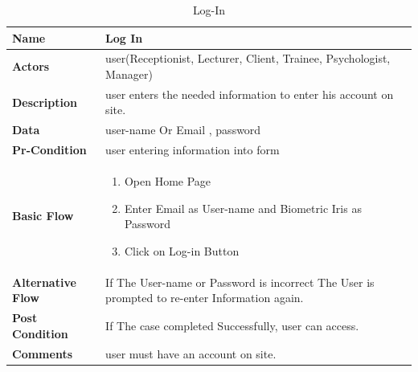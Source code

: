 \documentclass[../Psychological_system_web_application.tex]{subfiles}
\begin{document}
	\begin{center}
		\begin{table}[h!]
			\begin{tabular}{ | m{4cm} | m{10cm}| } 
				\hline
			 	\textbf{\large Name}& Log In\\ 
				\hline
			  	\textbf{\large Actors}& user(Receptionist, Lecturer, Client, Trainee, Psychologist, Manager)\\ 
				\hline
			  	\textbf{\large Description}& user enters the needed information to enter his account on site.\\ 
				\hline
				\textbf{\large Data}& user-name Or Email , password\\ 
				\hline
				\textbf{\large Pr-Condition}&user entering information into form \\
				\hline
				\textbf{\large Basic Flow}&\begin{enumerate}
				\item
					Open Home Page 
				\item
					Enter Email as User-name and Biometric Iris as Password
				\item
					Click on Log-in Button \end{enumerate}				 \\
				\hline
				\textbf{\large Alternative Flow}& If The User-name or Password is incorrect The User is prompted to re-enter Information again.\\ 
				\hline
				\textbf{\large Post Condition}& If The case completed Successfully, user can access.\\ 
				\hline
				\textbf{\large Comments}& user must have an account on site.\\ 
				\hline
			\end{tabular}
			\caption{Log-In}
			\label{table:LOG_IN}
		\end{table}
	\end{center}
\end{document}
